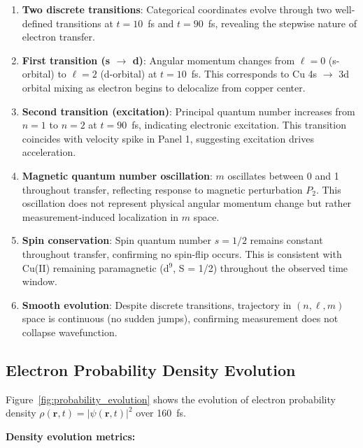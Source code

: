 \documentclass[twocolumn,10pt]{article}
\begin{document}
\begin{enumerate}
\item \textbf{Two discrete transitions}: Categorical coordinates evolve through 
two well-defined transitions at $t = 10$~fs and $t = 90$~fs, revealing the 
stepwise nature of electron transfer.

\item \textbf{First transition (s $\to$ d)}: Angular momentum changes from 
$\ell = 0$ (s-orbital) to $\ell = 2$ (d-orbital) at $t = 10$~fs. This corresponds 
to Cu 4s $\to$ 3d orbital mixing as electron begins to delocalize from copper 
center.

\item \textbf{Second transition (excitation)}: Principal quantum number increases 
from $n = 1$ to $n = 2$ at $t = 90$~fs, indicating electronic excitation. This 
transition coincides with velocity spike in Panel 1, suggesting excitation drives 
acceleration.

\item \textbf{Magnetic quantum number oscillation}: $m$ oscillates between 0 and 1 
throughout transfer, reflecting response to magnetic perturbation $P_2$. This 
oscillation does not represent physical angular momentum change but rather 
measurement-induced localization in $m$ space.

\item \textbf{Spin conservation}: Spin quantum number $s = 1/2$ remains constant 
throughout transfer, confirming no spin-flip occurs. This is consistent with 
Cu(II) remaining paramagnetic (d$^9$, S = 1/2) throughout the observed time window.

\item \textbf{Smooth evolution}: Despite discrete transitions, trajectory in 
$(n,\ell,m)$ space is continuous (no sudden jumps), confirming measurement does 
not collapse wavefunction.
\end{enumerate}

\subsection{Electron Probability Density Evolution}

Figure~\ref{fig:probability_evolution} shows the evolution of electron probability 
density $\rho(\mathbf{r}, t) = |\psi(\mathbf{r}, t)|^2$ over 160~fs.


\textbf{Density evolution metrics:}
\end{document}
